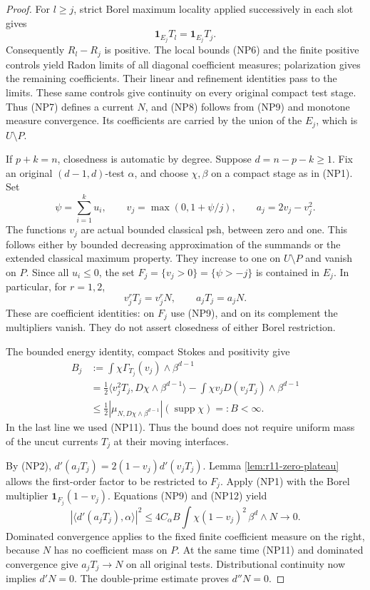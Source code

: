 \documentclass[11pt,a4paper]{article}
\numberwithin{equation}{section}
\theoremstyle{definition}
\theoremstyle{remark}
\begin{document}
\begin{proof}
For $l\geq j$, strict Borel maximum locality applied successively in
each slot gives
\[
                       \mathbf1_{E_j}T_l=\mathbf1_{E_j}T_j.
 \tag{NP9}
\]
Consequently $R_l-R_j$ is positive.  The local bounds (NP6) and the
finite positive controls yield Radon limits of all diagonal coefficient
measures; polarization gives the remaining coefficients.  Their linear
and refinement identities pass to the limits.  These same controls
give continuity on every original compact test stage.  Thus (NP7)
defines a current $N$, and (NP8) follows from (NP9) and monotone
measure convergence.  Its coefficients are carried by the union
of the $E_j$, which is $U\setminus P$.

If $p+k=n$, closedness is automatic by degree.  Suppose
$d=n-p-k\geq1$.  Fix an original $(d-1,d)$-test $\alpha$,
and choose $\chi,\beta$ on a compact stage as in (NP1).  Set
\[
 \psi=\sum_{i=1}^k u_i,\qquad
 v_j=\max(0,1+\psi/j),\qquad a_j=2v_j-v_j^2.
 \tag{NP10}
\]
The functions $v_j$ are actual bounded classical psh, between zero
and one.  This follows either by bounded decreasing approximation of
the summands or the extended classical maximum property.  They
increase to one on $U\setminus P$ and vanish on $P$.
Since all $u_i\leq0$, the set $F_j=\{v_j>0\}=\{\psi>-j\}$
is contained in $E_j$.  In particular, for $r=1,2$,
\[
 v_j^rT_j=v_j^rN,\qquad a_jT_j=a_jN.
 \tag{NP11}
\]
These are coefficient identities: on $F_j$ use (NP9), and on its
complement the multipliers vanish.  They do not assert closedness of
either Borel restriction.

The bounded energy identity, compact Stokes and positivity give
\begin{align*}
 B_j&:=\int\chi\Gamma_{T_j}(v_j)\wedge\beta^{d-1}\\
 &=\tfrac12\langle v_j^2T_j,D\chi\wedge\beta^{d-1}\rangle
      -\int\chi v_jD(v_jT_j)\wedge\beta^{d-1}\\
 &\leq\tfrac12|\mu_{N,D\chi\wedge\beta^{d-1}}|
                      (\operatorname{supp}\chi)=:B<\infty.
 \tag{NP12}
\end{align*}
In the last line we used (NP11).  Thus the bound does not require
uniform mass of the uncut currents $T_j$ at their moving interfaces.

By (NP2), $d'(a_jT_j)=2(1-v_j)d'(v_jT_j)$.  Lemma
\ref{lem:r11-zero-plateau} allows the first-order factor to be
restricted to $F_j$.  Apply (NP1) with the Borel multiplier
$\mathbf1_{F_j}(1-v_j)$.  Equations (NP9) and (NP12) yield
\[
 |\langle d'(a_jT_j),\alpha\rangle|^2
 \leq4C_\alpha B
       \int\chi(1-v_j)^2\,\beta^d\wedge N
                       \longrightarrow0.
 \tag{NP13}
\]
Dominated convergence applies to the fixed finite coefficient measure
on the right, because $N$ has no coefficient mass on $P$.
At the same time (NP11) and dominated convergence give $a_jT_j\to N$
on all original tests.  Distributional continuity now implies
$d'N=0$.  The double-prime estimate proves $d''N=0$.


\end{proof}
\end{document}
